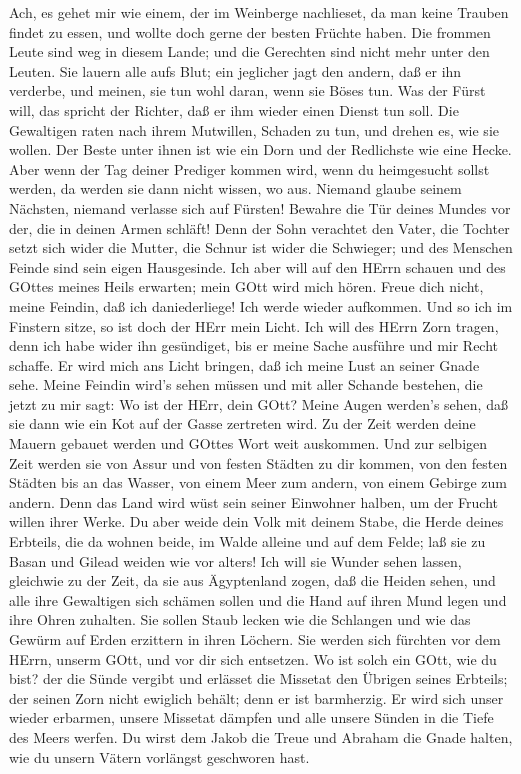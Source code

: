  Ach, es gehet mir wie einem, der im Weinberge nachlieset,
da man keine Trauben findet zu essen, und wollte doch gerne der besten
Früchte haben.  Die frommen Leute sind weg in diesem Lande;
und die Gerechten sind nicht mehr unter den Leuten. Sie lauern alle aufs
Blut; ein jeglicher jagt den andern, daß er ihn verderbe, 
und meinen, sie tun wohl daran, wenn sie Böses tun. Was der Fürst will,
das spricht der Richter, daß er ihm wieder einen Dienst tun soll. Die
Gewaltigen raten nach ihrem Mutwillen, Schaden zu tun, und drehen es,
wie sie wollen.  Der Beste unter ihnen ist wie ein Dorn und
der Redlichste wie eine Hecke. Aber wenn der Tag deiner Prediger kommen
wird, wenn du heimgesucht sollst werden, da werden sie dann nicht
wissen, wo aus.  Niemand glaube seinem Nächsten, niemand
verlasse sich auf Fürsten! Bewahre die Tür deines Mundes vor der, die in
deinen Armen schläft!  Denn der Sohn verachtet den Vater,
die Tochter setzt sich wider die Mutter, die Schnur ist wider die
Schwieger; und des Menschen Feinde sind sein eigen Hausgesinde.
 Ich aber will auf den HErrn schauen und des GOttes meines
Heils erwarten; mein GOtt wird mich hören.  Freue dich
nicht, meine Feindin, daß ich daniederliege! Ich werde wieder aufkommen.
Und so ich im Finstern sitze, so ist doch der HErr mein Licht.
 Ich will des HErrn Zorn tragen, denn ich habe wider ihn
gesündiget, bis er meine Sache ausführe und mir Recht schaffe. Er wird
mich ans Licht bringen, daß ich meine Lust an seiner Gnade sehe.
 Meine Feindin wird's sehen müssen und mit aller Schande
bestehen, die jetzt zu mir sagt: Wo ist der HErr, dein GOtt? Meine Augen
werden's sehen, daß sie dann wie ein Kot auf der Gasse zertreten wird.
 Zu der Zeit werden deine Mauern gebauet werden und GOttes
Wort weit auskommen.  Und zur selbigen Zeit werden sie von
Assur und von festen Städten zu dir kommen, von den festen Städten bis
an das Wasser, von einem Meer zum andern, von einem Gebirge zum andern.
 Denn das Land wird wüst sein seiner Einwohner halben, um
der Frucht willen ihrer Werke.  Du aber weide dein Volk mit
deinem Stabe, die Herde deines Erbteils, die da wohnen beide, im Walde
alleine und auf dem Felde; laß sie zu Basan und Gilead weiden wie vor
alters!  Ich will sie Wunder sehen lassen, gleichwie zu der
Zeit, da sie aus Ägyptenland zogen,  daß die Heiden sehen,
und alle ihre Gewaltigen sich schämen sollen und die Hand auf ihren Mund
legen und ihre Ohren zuhalten.  Sie sollen Staub lecken wie
die Schlangen und wie das Gewürm auf Erden erzittern in ihren Löchern.
Sie werden sich fürchten vor dem HErrn, unserm GOtt, und vor dir sich
entsetzen.  Wo ist solch ein GOtt, wie du bist? der die
Sünde vergibt und erlässet die Missetat den Übrigen seines Erbteils; der
seinen Zorn nicht ewiglich behält; denn er ist barmherzig. 
Er wird sich unser wieder erbarmen, unsere Missetat dämpfen und alle
unsere Sünden in die Tiefe des Meers werfen.  Du wirst dem
Jakob die Treue und Abraham die Gnade halten, wie du unsern Vätern
vorlängst geschworen hast.

